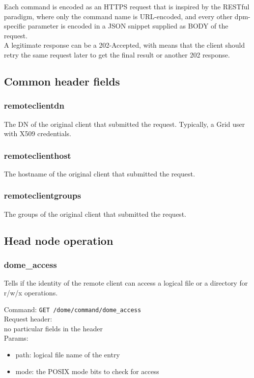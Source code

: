 \documentclass[a4paper,10pt]{scrreprt}
\begin{document}
Each command is encoded as an HTTPS request that is inspired by the RESTful paradigm, where only the command name is URL-encoded, and every other dpm-specific parameter is encoded in a JSON snippet supplied as BODY of the request.\\

A legitimate response can be a 202-Accepted, with means that the client should retry the same request later to get the final result or another 202 response.\\

\subsection{Common header fields}


\subsubsection{remoteclientdn}
The DN of the original client that submitted the request. Typically, a Grid user with X509 credentials.\\

\subsubsection{remoteclienthost}
The hostname of the original client that submitted the request.

\subsubsection{remoteclientgroups}
The groups of the original client that submitted the request.

\subsection{Head node operation}


\subsubsection{dome\_access}
Tells if the identity of the remote client can access a logical file or a directory for r/w/x operations.

Command:
\lstinline"GET /dome/command/dome_access"\\
Request header:\\
 no particular fields in the header\\
Params:
\begin{itemize}
 \item path: logical file name of the entry
 \item mode: the POSIX mode bits to check for access
\end{itemize}
\end{document}
